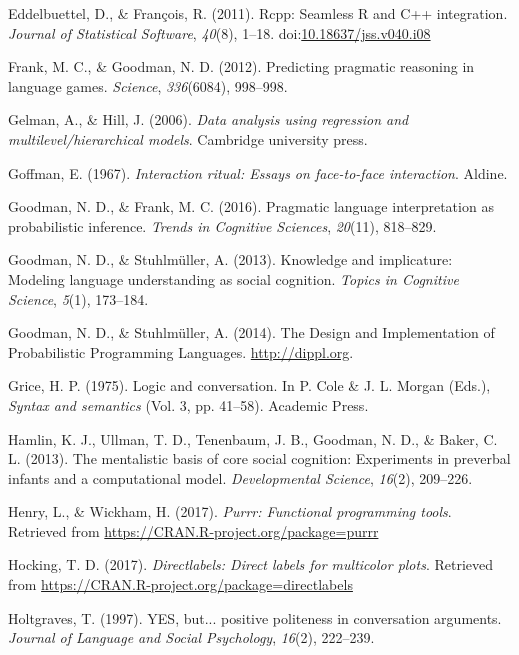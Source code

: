 \documentclass[floatsintext,man]{apa6}
\theoremstyle{definition}
\theoremstyle{definition}
\theoremstyle{definition}
\theoremstyle{remark}
\begin{document}
\hypertarget{ref-R-Rcpp_a}{}
Eddelbuettel, D., \& François, R. (2011). Rcpp: Seamless R and C++
integration. \emph{Journal of Statistical Software}, \emph{40}(8),
1--18.
doi:\href{https://doi.org/10.18637/jss.v040.i08}{10.18637/jss.v040.i08}

\hypertarget{ref-frank2012}{}
Frank, M. C., \& Goodman, N. D. (2012). Predicting pragmatic reasoning
in language games. \emph{Science}, \emph{336}(6084), 998--998.

\hypertarget{ref-gelman2006data}{}
Gelman, A., \& Hill, J. (2006). \emph{Data analysis using regression and
multilevel/hierarchical models}. Cambridge university press.

\hypertarget{ref-goffman1967}{}
Goffman, E. (1967). \emph{Interaction ritual: Essays on face-to-face
interaction}. Aldine.

\hypertarget{ref-goodman2016}{}
Goodman, N. D., \& Frank, M. C. (2016). Pragmatic language
interpretation as probabilistic inference. \emph{Trends in Cognitive
Sciences}, \emph{20}(11), 818--829.

\hypertarget{ref-goodman2013}{}
Goodman, N. D., \& Stuhlmüller, A. (2013). Knowledge and implicature:
Modeling language understanding as social cognition. \emph{Topics in
Cognitive Science}, \emph{5}(1), 173--184.

\hypertarget{ref-dippl}{}
Goodman, N. D., \& Stuhlmüller, A. (2014). The Design and Implementation
of Probabilistic Programming Languages. \url{http://dippl.org}.

\hypertarget{ref-grice1975}{}
Grice, H. P. (1975). Logic and conversation. In P. Cole \& J. L. Morgan
(Eds.), \emph{Syntax and semantics} (Vol. 3, pp. 41--58). Academic
Press.

\hypertarget{ref-hamlin2013mentalistic}{}
Hamlin, K. J., Ullman, T. D., Tenenbaum, J. B., Goodman, N. D., \&
Baker, C. L. (2013). The mentalistic basis of core social cognition:
Experiments in preverbal infants and a computational model.
\emph{Developmental Science}, \emph{16}(2), 209--226.

\hypertarget{ref-R-purrr}{}
Henry, L., \& Wickham, H. (2017). \emph{Purrr: Functional programming
tools}. Retrieved from \url{https://CRAN.R-project.org/package=purrr}

\hypertarget{ref-R-directlabels}{}
Hocking, T. D. (2017). \emph{Directlabels: Direct labels for multicolor
plots}. Retrieved from
\url{https://CRAN.R-project.org/package=directlabels}

\hypertarget{ref-holtgraves1997}{}
Holtgraves, T. (1997). YES, but... positive politeness in conversation
arguments. \emph{Journal of Language and Social Psychology},
\emph{16}(2), 222--239.
\end{document}

